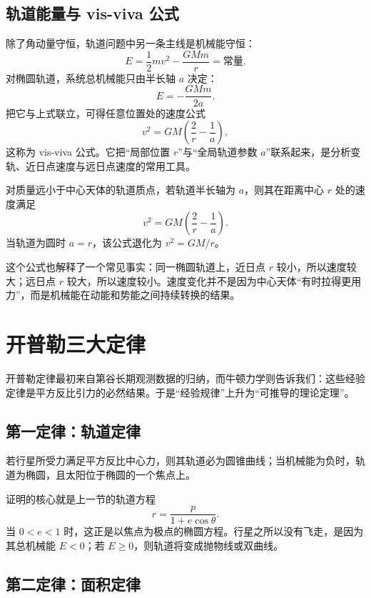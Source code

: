 \subsection{轨道能量与 vis-viva 公式}

除了角动量守恒，轨道问题中另一条主线是机械能守恒：
\[
E=\frac12 mv^2-\frac{GMm}{r}=\text{常量}.
\]
对椭圆轨道，系统总机械能只由半长轴 $a$ 决定：
\[
E=-\frac{GMm}{2a}.
\]
把它与上式联立，可得任意位置处的速度公式
\[
v^2=GM\left(\frac{2}{r}-\frac{1}{a}\right),
\]
这称为 vis-viva 公式。它把“局部位置 $r$”与“全局轨道参数 $a$”联系起来，是分析变轨、近日点速度与远日点速度的常用工具。

\begin{theorem}
对质量远小于中心天体的轨道质点，若轨道半长轴为 $a$，则其在距离中心 $r$ 处的速度满足
\[
v^2=GM\left(\frac{2}{r}-\frac{1}{a}\right).
\]
当轨道为圆时 $a=r$，该公式退化为 $v^2=GM/r$。
\end{theorem}

这个公式也解释了一个常见事实：同一椭圆轨道上，近日点 $r$ 较小，所以速度较大；远日点 $r$ 较大，所以速度较小。速度变化并不是因为中心天体“有时拉得更用力”，而是机械能在动能和势能之间持续转换的结果。

\section{开普勒三大定律}

开普勒定律最初来自第谷长期观测数据的归纳，而牛顿力学则告诉我们：这些经验定律是平方反比引力的必然结果。于是“经验规律”上升为“可推导的理论定理”。

\subsection{第一定律：轨道定律}

\begin{theorem}[开普勒第一定律的牛顿推导]
若行星所受力满足平方反比中心力，则其轨道必为圆锥曲线；当机械能为负时，轨道为椭圆，且太阳位于椭圆的一个焦点上。
\end{theorem}

证明的核心就是上一节的轨道方程
\[
r=\frac{p}{1+e\cos\theta}.
\]
当 $0<e<1$ 时，这正是以焦点为极点的椭圆方程。行星之所以没有飞走，是因为其总机械能 $E<0$；若 $E\ge 0$，则轨道将变成抛物线或双曲线。

\subsection{第二定律：面积定律}

